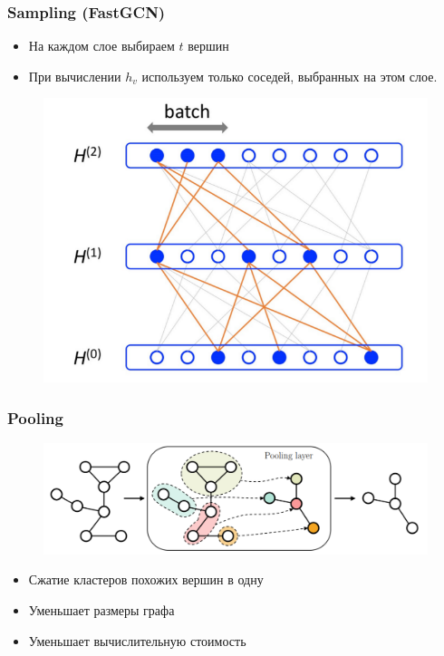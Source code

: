 \documentclass{beamer}
\begin{document}
\begin{frame}
\frametitle{Sampling (FastGCN)}
\begin{multicols}{2}
\begin{itemize}
	\item На каждом слое выбираем $t$ вершин
	\item При вычислении $h_v$ используем только соседей, выбранных на этом слое.
\end{itemize}
	
\columnbreak
	\begin{figure}
		\includegraphics[width=\columnwidth]{fastGCN.png}
	\end{figure}
\end{multicols}
\end{frame}

\begin{frame}
\frametitle{Pooling}
\begin{figure}
	\includegraphics[width=\columnwidth]{pooling.png}
\end{figure}
\begin{itemize}
	\item Сжатие кластеров похожих вершин в одну
	\item Уменьшает размеры графа
	\item Уменьшает вычислительную стоимость
\end{itemize}
\end{frame}
\end{document}
